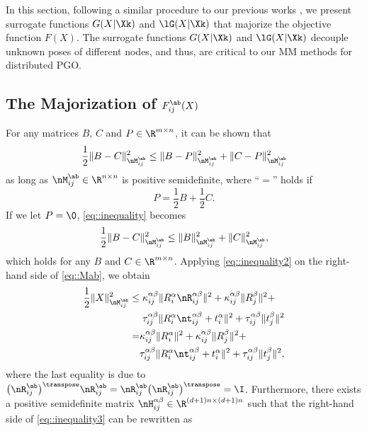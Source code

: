 In this section, following a similar procedure to our previous works \cite{fan2019proximal,fan2020mm}, we  present surrogate functions $G(X|\Xk)$ and $\lG(X|\Xk)$ that majorize the objective function $F(X)$. The surrogate functions $G(X|\Xk)$ and $\lG(X|\Xk)$ decouple unknown poses of different nodes, and thus, are critical to our MM methods for distributed PGO.


\subsection{The Majorization of $F_{ij}^{\ab}(X)$}
For any matrices $B,\,C$ and $P\in \R^{m\times n}$, it can be shown that
\begin{equation}\label{eq::inequality}
\frac{1}{2}\|B-C\|_{\nM_{ij}^{\ab}}^2 \leq \|B-P\|_{\nM_{ij}^{\ab}}^2 + \|C-P\|_{\nM_{ij}^{\ab}}^2
\end{equation}
as long as $\nM_{ij}^{\ab}\in\R^{n\times n}$ is positive semidefinite, where ``$=$'' holds if
$$P=\frac{1}{2}B+\frac{1}{2}C.$$
If we let $P=\0$, \cref{eq::inequality} becomes
\begin{equation}\label{eq::inequality2}
\frac{1}{2}\|B-C\|_{\nM_{ij}^{\ab}}^2 \leq \|B\|_{\nM_{ij}^{\ab}}^2 + \|C\|_{\nM_{ij}^{\ab}}^2,
\end{equation}
{\highlight which holds for any $B$ and $C\in \R^{m\times n}$.} Applying \cref{eq::inequality2} on the right-hand side of \cref{eq::Mab}, we obtain
\begin{equation}\label{eq::inequality3}
\begin{aligned}
\frac{1}{2}\|X\|_{\nM_{ij}^{\ab}}^2\leq&\;\kappa_{ij}^{\alpha\beta}\|R_i^\alpha\nR_{ij}^{\alpha\beta}\|^2+\kappa_{ij}^{\alpha\beta}\|R_j^\beta\|^2+\\
&\;\tau_{ij}^{\alpha\beta}\|R_i^\alpha \nt_{ij}^{\alpha\beta}+t_i^\alpha\|^2+\tau_{ij}^{\alpha\beta}\|t_j^\beta\|^2\\
=&\kappa_{ij}^{\alpha\beta}\|R_i^\alpha\|^2+\kappa_{ij}^{\alpha\beta}\|R_j^\beta\|^2+\\
&\tau_{ij}^{\alpha\beta}\|R_i^\alpha \nt_{ij}^{\alpha\beta}+t_i^\alpha\|^2+\tau_{ij}^{\alpha\beta}\|t_j^\beta\|^2,
\end{aligned}
\end{equation}
where the last equality is due to $\big(\nR_{ij}^{\ab}\big)^\transpose\nR_{ij}^{\ab}=\nR_{ij}^{\ab}\big(\nR_{ij}^{\ab}\big)^\transpose=\I$. Furthermore, there exists a positive semidefinite matrix $\nH_{ij}^{\alpha\beta}\in \R^{(d+1)n\times (d+1)n}$ such that the right-hand side of \cref{eq::inequality3} can be rewritten as
